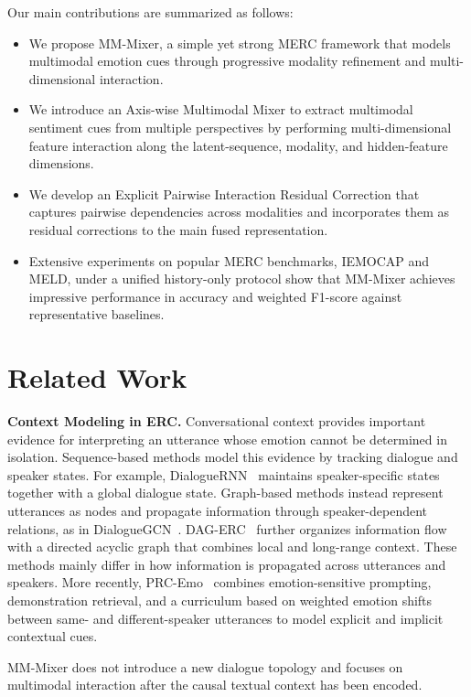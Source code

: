\documentclass[letterpaper]{article} %
\begin{document}
Our main contributions are summarized as follows:
\begin{itemize}
\item We propose MM-Mixer, a simple yet strong MERC framework that models multimodal emotion cues through progressive modality refinement and multi-dimensional interaction.
\item We introduce an Axis-wise Multimodal Mixer to extract multimodal sentiment cues from multiple perspectives by performing multi-dimensional feature interaction along the latent-sequence, modality, and hidden-feature dimensions.
\item We develop an Explicit Pairwise Interaction Residual Correction that captures pairwise dependencies across modalities and incorporates them as residual corrections to the main fused representation. 

\item Extensive experiments on popular MERC benchmarks, IEMOCAP and MELD, under a unified history-only protocol show that  MM-Mixer achieves impressive performance in accuracy and weighted F1-score against representative baselines.
\end{itemize}
\section{Related Work}

\noindent\textbf{Context Modeling in ERC.}
Conversational context provides important evidence for interpreting an utterance whose emotion cannot be determined in isolation. Sequence-based methods model this evidence by tracking dialogue and speaker states. For example, DialogueRNN~\cite{dialoguernn} maintains speaker-specific states together with a global dialogue state. Graph-based methods instead represent utterances as nodes and propagate information through speaker-dependent relations, as in DialogueGCN~\cite{dialoguegcn}. DAG-ERC~\cite{dagerc} further organizes information flow with a directed acyclic graph that combines local and long-range context. These methods mainly differ in how information is propagated across utterances and speakers. More recently, PRC-Emo~\cite{prcemo} combines emotion-sensitive prompting, demonstration retrieval, and a curriculum based on weighted emotion shifts between same- and different-speaker utterances to model explicit and implicit contextual cues.

MM-Mixer does not introduce a new dialogue topology and focuses on multimodal interaction after the causal textual context has been encoded.
\end{document}
